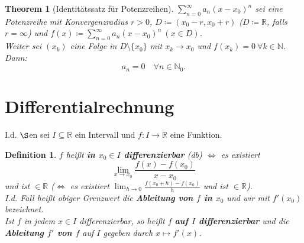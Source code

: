 \documentclass[14pt,titlepage,ngerman,a4paper,headsepline,DIV15,halfparskip*]{scrartcl}
\newcommand{\N}{\mathbb{N}}
\newcommand{\R}{\mathbb{R}}
\theoremstyle{named}
\newtheorem{namedtheorem}{Theorem} \counterwithin{namedtheorem}{section}
\theoremstyle{dotless}
\newtheorem*{definition}{Definition}
\begin{document}
\begin{namedtheorem}[Identitätssatz für Potenzreihen] \label{8.4:prop-IdentitätssatzFürPotenzreihe}
	$\sum_{n=0}^{\infty} a_{n} (x - x_{0})^{n}$ sei eine Potenzreihe mit Konvergenzradius $r > 0$, $D \coloneqq (x_{0} - r, x_{0} + r)$ ($D \coloneqq \R$, falls $r = \infty$) und $f(x) \coloneqq \sum_{n=0}^{\infty} a_{n} (x - x_{0})^{n} ~(x \in D)$. \\
	Weiter sei $(x_{k})$ eine Folge in $D \setminus \{ x_{0} \}$ mit $x_{k} \rightarrow x_{0}$ und $f(x_{k}) = 0 ~\forall k \in \N$. Dann:
	$$ a_{n} = 0 \quad \forall n \in \N_{0}. $$ 
\end{namedtheorem}


\newpage


\section{Differentialrechnung}

I.d. $\S$en sei $I \subseteq \R$ ein Intervall und $f \colon I \rightarrow \R$ eine Funktion. 

 
\begin{definition}
	$f$ hei{\ss}t \textbf{in $x_{0} \in I$ differenzierbar} (db) $\iff$ es existiert
		$$\lim_{x \rightarrow x_{0}} \frac{f(x) - f(x_{0})}{x - x_{0}} $$
	und ist $\in \R$ ($\iff$ es existiert $\lim_{h \rightarrow 0} \frac{f(x_{0} + h) - f(x_{0})}{h}$ und ist $\in \R$). \\
	I.d. Fall hei{\ss}t obiger Grenzwert die \textbf{Ableitung von $f$ in $x_{0}$} und wir mit $f'(x_{0})$ bezeichnet. \\
	Ist $f$ in jedem $x \in I$ differenzierbar, so hei{\ss}t $f$ \textbf{auf $I$ differenzierbar} und die \textbf{Ableitung $f'$ von $f$} auf $I$ gegeben durch $x \mapsto f'(x)$.
\end{definition}
\end{document}
